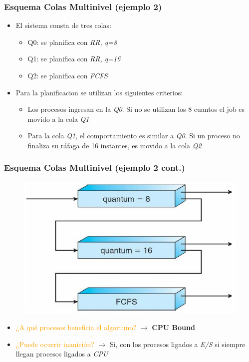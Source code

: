 \begin{frame}
  \frametitle{Esquema \textbf{Colas Multinivel} (ejemplo 2)}
  \begin{itemize}
  		\item El sistema consta de tres colas:
  		\begin{itemize}
  			\item Q0: se planifica con \emph{RR, q=8}
  			\item Q1: se planifica con \emph{RR, q=16}
  			\item Q2: se planifica con \emph{FCFS}
  		\end{itemize}
  		\item Para la planificacion se utilizan los siguientes criterios:
  		\begin{itemize}
  			\item Los procesos ingresan en la \emph{Q0}. Si no se utilizan los 8 cuantos el job es movido a la cola \emph{Q1}
  			\item Para la cola \emph{Q1}, el comportamiento es similar a \emph{Q0}. Si un proceso no finaliza su ráfaga de 16 instantes, es movido a la cola \emph{Q2}
  		\end{itemize}
  \end{itemize}
\end{frame}

\begin{frame}
  \frametitle{Esquema \textbf{Colas Multinivel} (ejemplo 2 cont.)}
	\begin{figure}
    	\includegraphics[scale=0.4]{images/multilevelSchemaExample2.png}
	\end{figure}
	\begin{itemize}
		\pause
		\item \textcolor{orange}{¿A qué procesos beneficia el algoritmo?}
		\pause
		$\rightarrow$ \textbf{CPU Bound}
	\pause  			
		\item \textcolor{orange}{¿Puede ocurrir inanición?}
	\pause
		$\rightarrow$ Si, con los procesos ligados a \emph{E/S} si siempre llegan procesos ligados a \emph{CPU}
	\end{itemize}
\end{frame}

